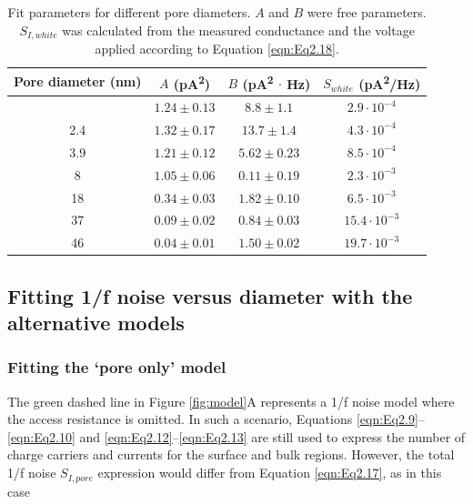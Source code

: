 \begin{table}[h]
	\begin{center}
		\begin{tabular}{|c|c|c|c|}
			\hline 
			Pore diameter (nm) & $A$ (pA\textsuperscript{2}) & $B$ (pA\textsuperscript{2} $\cdot$ Hz) & $S_{white}$ (pA\textsuperscript{2}/Hz)\\
			\hline 
			\centering
			1.3 & $1.24\pm 0.13$ & $8.8\pm  1.1$  & $2.9\cdot10^{-4} $ \\
			2.4 & $1.32\pm 0.17$ & $13.7\pm 1.4$  & $4.3\cdot10^{-4} $ \\
			3.9 & $1.21\pm 0.12$ & $5.62\pm 0.23$ & $8.5\cdot10^{-4} $ \\
			8   & $1.05\pm 0.06$ & $0.11\pm 0.19$ & $2.3\cdot10^{-3} $ \\
			18  & $0.34\pm 0.03$ & $1.82\pm 0.10$ & $6.5\cdot10^{-3} $ \\
			37  & $0.09\pm 0.02$ & $0.84\pm 0.03$ & $15.4\cdot10^{-3}$ \\
			46  & $0.04\pm 0.01$ & $1.50\pm 0.02$ & $19.7\cdot10^{-3}$ \\
			\hline 
		\end{tabular}
	  \caption{\label{tab:table2.1}Fit parameters for different pore diameters. $A$ and $B$ were free parameters. $S_{I,white}$ was calculated from the measured conductance and the voltage applied according to Equation \ref{eqn:Eq2.18}.}
	\end{center}
\end{table}




\subsection{Fitting 1/f noise versus diameter with the alternative models}\label{sec:S2.4.3}


\subsubsection{Fitting the ‘pore only’ model}


The green dashed line in Figure \ref{fig:model}A represents a 1/f noise model where the access resistance is omitted. In such a scenario, Equations \ref{eqn:Eq2.9}–\ref{eqn:Eq2.10} and \ref{eqn:Eq2.12}–\ref{eqn:Eq2.13} are still used to express the number of charge carriers and currents for the surface and bulk regions. However, the total 1/f noise $S_{I,pore}$ expression would differ from Equation \ref{eqn:Eq2.17}, as in this case 


